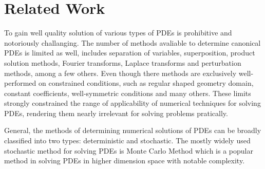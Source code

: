 \section{Related Work}

To gain well quality solution of various types of PDEs is prohibitive and notoriously challanging.
The number of methods avaliable to determine canonical PDEs is limited as well,
includes 
separation of variables, 
superposition, 
product solution methods, 
Fourier transforms, 
Laplace transforms and 
perturbation methods, 
among a few others.
Even though there methods are exclusively well-performed on constrained conditions,
such as regular shaped geometry domain, constant coefficients, well-symmetric conditions 
and many others.
These limits strongly constrained the range of applicability of numerical techniques for solving PDEs,
rendering them nearly irrelevant for solving problems pratically.

General, the methods of determining numerical solutions of PDEs can be broadly classified into
two types: 
deterministic 
and stochastic. 
The mostly widely used stochastic method for solving PDEs is 
Monte Carlo Method \cite{Monte Carlo Method} which is a popular method in solving PDEs in higher dimension space with 
notable complexity.

